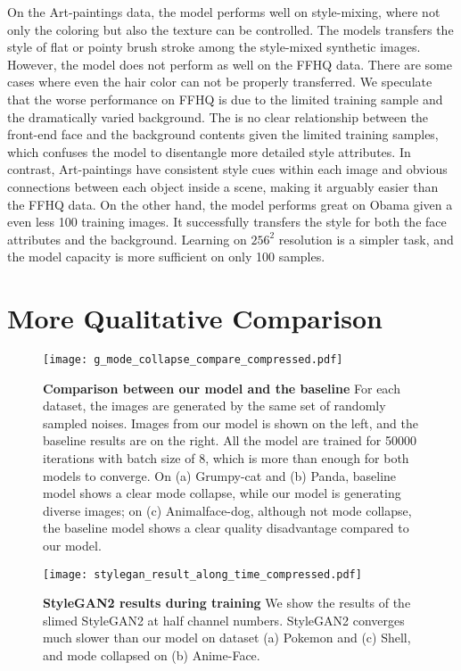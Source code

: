 \documentclass{article} \usepackage{iclr2021_conference,times}
\begin{document}
On the Art-paintings data, the model performs well on style-mixing, where not only the coloring but also the texture can be controlled. The models transfers the style of flat or pointy brush stroke among the style-mixed synthetic images. However, the model does not perform as well on the FFHQ data. There are some cases where even the hair color can not be properly transferred. We speculate that the worse performance on FFHQ is due to the limited training sample and the dramatically varied background. The is no clear relationship between the front-end face and the background contents given the limited training samples, which confuses the model to disentangle more detailed style attributes. In contrast, Art-paintings have consistent style cues within each image and obvious connections between each object inside a scene, making it arguably easier than the FFHQ data. On the other hand, the model performs great on Obama given a even less 100 training images. It successfully transfers the style for both the face attributes and the background. Learning on $256^2$ resolution is a simpler task, and the model capacity is more sufficient on only 100 samples.  

\clearpage
\section{More Qualitative Comparison}

\begin{figure}[h]
\vspace{-2mm}
\centering
\texttt{[image: g\_mode\_collapse\_compare\_compressed.pdf]}
\caption{\textbf{Comparison between our model and the baseline} For each dataset, the images are generated by the same set of randomly sampled noises. Images from our model is shown on the left, and the baseline results are on the right. All the model are trained for 50000 iterations with batch size of 8, which is more than enough for both models to converge. On (a) Grumpy-cat and (b) Panda, baseline model shows a clear mode collapse, while our model is generating diverse images; on (c) Animalface-dog, although not mode collapse, the baseline model shows a clear quality disadvantage compared to our model.}
\label{fig:style-mixing-multilayer}
\end{figure}


\begin{figure}[h]
\vspace{-2mm}
\centering
\texttt{[image: stylegan\_result\_along\_time\_compressed.pdf]}
\caption{\textbf{StyleGAN2 results during training} We show the results of the slimed StyleGAN2 at half channel numbers. StyleGAN2 converges much slower than our model on dataset (a) Pokemon and (c) Shell, and mode collapsed on (b) Anime-Face. }
\label{fig:style-mixing-multilayer}
\end{figure}
\end{document}
